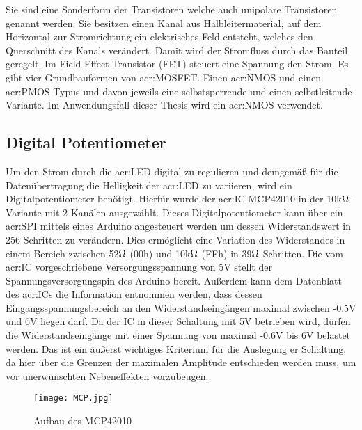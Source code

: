 Sie sind eine Sonderform der Transistoren welche auch unipolare Transistoren genannt werden. Sie besitzen einen Kanal aus Halbleitermaterial, auf dem Horizontal zur Stromrichtung ein elektrisches Feld entsteht, welches den Querschnitt des Kanals verändert. Damit wird der Stromfluss durch das Bauteil geregelt. Im Field-Effect Transistor (FET) steuert eine Spannung den Strom. Es gibt vier Grundbauformen von \gls{acr:MOSFET}. Einen \gls{acr:NMOS} und einen \gls{acr:PMOS} Typus und davon jeweils eine selbstsperrende und einen selbstleitende Variante. Im Anwendungsfall dieser Thesis wird ein \gls{acr:NMOS} verwendet. \cite{heringElektrotechnikUndElektronik2018}

\newpage
\subsection{Digital Potentiometer}
\label{subsec:Unterabschnitt12}

Um den Strom durch die \gls{acr:LED} digital zu regulieren und demgemäß für die Datenübertragung die Helligkeit der \gls{acr:LED} zu variieren, wird ein Digitalpotentiometer benötigt. Hierfür wurde der \gls{acr:IC} MCP42010 in der 10k$\ohm$–Variante mit 2 Kanälen ausgewählt. Dieses Digitalpotentiometer kann über ein \gls{acr:SPI} mittels eines Arduino angesteuert werden um dessen Widerstandswert in 256 Schritten zu verändern. Dies ermöglicht eine Variation des Widerstandes in einem Bereich zwischen 52$\ohm$ (00h) und 10k$\ohm$ (FFh) in 39$\ohm$ Schritten. 
Die vom \gls{acr:IC} vorgeschriebene Versorgungsspannung von 5V stellt der Spannungsversorgungspin des Arduino bereit. Außerdem kann dem Datenblatt des \gls{acr:IC}s die Information entnommen werden, dass dessen Eingangsspannungsbereich an den Widerstandseingängen maximal zwischen -0.5V und 6V liegen darf. Da der IC in dieser Schaltung mit 5V betrieben wird, dürfen die Widerstandseingänge mit einer Spannung von maximal -0.6V bis 6V belastet werden. Das ist ein äußerst wichtiges Kriterium für die Auslegung er Schaltung, da hier über die Grenzen der maximalen Amplitude entschieden werden muss, um vor unerwünschten Nebeneffekten vorzubeugen.

\begin{figure}[H]
	\centering
	\texttt{[image: MCP.jpg]}
	\caption[Aufbau des MCP42010]{Aufbau des MCP42010} 
	\cite{MCP42}
	\label{fig:MCP}
\end{figure}

